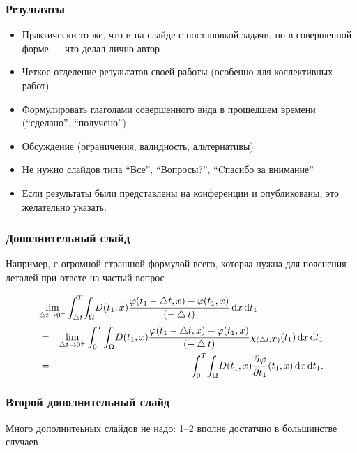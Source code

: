 \documentclass{beamer}
\begin{document}
\begin{frame}
  \frametitle{Результаты}
  \begin{itemize}
    \item Практически то же, что и на слайде с постановкой задачи, но в совершенной форме --- что делал лично автор
    \item Четкое отделение результатов своей работы (особенно для коллективных работ)
    \item Формулировать глаголами совершенного вида в прошедшем времени (``сделано'', ``получено'')
    \item Обсуждение (ограничения, валидность, альтернативы)
    \item Не нужно слайдов типа ``Все'', ``Вопросы?'', ``Cпасибо за внимание''
  \end{itemize}

  \begin{itemize}
    \item Если результаты были представлены на конференции и опубликованы, это желательно указать. 
  \end{itemize}
\end{frame}

\appendix

\begin{frame}
  \frametitle{Дополнительный слайд}
  Например, с огромной страшной формулой всего, которяа нужна для пояснения деталей при ответе на частый вопрос
  
\begin{eqnarray*}
\lefteqn{
\lim_{\bigtriangleup t \to 0^+}\int_{\bigtriangleup t}^{T} \! \int_{\Omega} \! D(t_1,x) \frac{\varphi(t_1-\bigtriangleup t,x)-\varphi(t_1,x)}{(-\bigtriangleup t)} \, \mathrm{d}x \, \mathrm{d}t_1 
}\\
&=&\lim_{\bigtriangleup t \to 0^+} \int_{0}^{T} \! \int_{\Omega} \! D(t_1,x) \frac{\varphi(t_1-\bigtriangleup t,x)-\varphi(t_1,x)}{(-\bigtriangleup t)} \chi_{(\bigtriangleup t,T)}(t_1) \, \mathrm{d}x \, \mathrm{d}t_1 
\\
&= &\int_{0}^{T} \! \int_{\Omega} \! D(t_1,x) \frac{\partial \varphi}{\partial t_1} (t_1,x) \, \mathrm{d}x \, \mathrm{d}t_1 .
\end{eqnarray*}
\end{frame}

\begin{frame}
  \frametitle{Второй дополнительный слайд}

Много дополнитеьных слайдов не надо: 1--2 вполне достатчно в большинстве случаев  
  
\end{frame}
\end{document}
